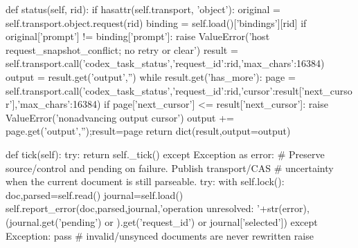     def status(self, rid):
        if hasattr(self.transport, 'object'):
            original = self.transport.object.request(rid)
            binding = self.load()['bindings'][rid]
            if original['prompt'] != binding['prompt']: raise ValueError('host request_snapshot_conflict; no retry or clear')
        result = self.transport.call('codex_task_status',{'request_id':rid,'max_chars':16384})
        output = result.get('output','')
        while result.get('has_more'):
            page = self.transport.call('codex_task_status',{'request_id':rid,'cursor':result['next_cursor'],'max_chars':16384})
            if page['next_cursor'] <= result['next_cursor']: raise ValueError('nonadvancing output cursor')
            output += page.get('output','');result=page
        return dict(result,output=output)

    def tick(self):
        try:
            return self._tick()
        except Exception as error:
            # Preserve source/control and pending on failure. Publish transport/CAS
            # uncertainty when the current document is still parseable.
            try:
                with self.lock():
                    doc,parsed=self.read()
                    journal=self.load()
                    self.report_error(doc,parsed,journal,'operation unresolved: '+str(error),(journal.get('pending') or {}).get('request_id') or journal['selected'])
            except Exception:
                pass  # invalid/unsynced documents are never rewritten
            raise

